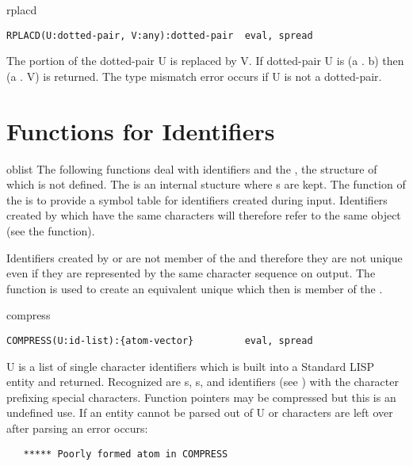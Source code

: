 \begin{Function}{rplacd}
\begin{verbatim}
RPLACD(U:dotted-pair, V:any):dotted-pair  eval, spread
\end{verbatim}
   The   portion  of the  dotted-pair U  is replaced by  V. If
   dotted-pair  U is (a  .  b)  then (a .   V) is  returned.  The
   type mismatch error occurs if U is not a dotted-pair.

\end{Function}

\section{Functions for Identifiers}

\begin{Concept}{oblist}
The following functions deal with identifiers and the ,
the structure of which is not defined.
The  is an internal stucture where s
are kept.  The function of the  is
to provide a symbol table for identifiers created during input.
Identifiers created by  which have the same characters will
therefore refer to the same object (see the  function).

Identifiers created by  or  are
not member of the  and therefore they are not 
unique even if they are represented by the same character
sequence on output. The function  is used
to create an equivalent unique  which then is
member of the .
\end{Concept}


\begin{Function}{compress}
\begin{verbatim}
COMPRESS(U:id-list):{atom-vector}         eval, spread
\end{verbatim}
   U  is a  list of single  character identifiers  which is built
   into  a Standard  LISP entity  and returned.    Recognized are
   s,  s, 
   and identifiers (see  ) with  the  character
   prefixing  special  characters.    Function pointers
   may  be compressed but this is an undefined use.  If an entity
   cannot  be parsed out  of U or characters  are left over after
   parsing an error occurs:
\begin{verbatim}
   ***** Poorly formed atom in COMPRESS
\end{verbatim}
\end{Function}

